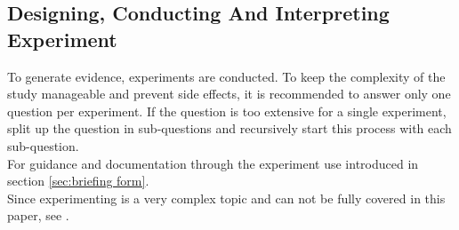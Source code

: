 
\subsection{Designing, Conducting And Interpreting Experiment}
\label{subsec:designing conducting and interpreting experiment}
To generate evidence, experiments are conducted. To keep the complexity of the study manageable and prevent side effects, it is recommended to answer only one question per experiment. If the question is too extensive for a single experiment, split up the question in sub-questions and recursively start this process with each sub-question.\\
For guidance and documentation through the experiment use \briefingform introduced in section \ref{sec:briefing form}.\\
Since experimenting is a very complex topic and can not be fully covered in this paper, see \cite{Wohlin2012,Tullis2013}.